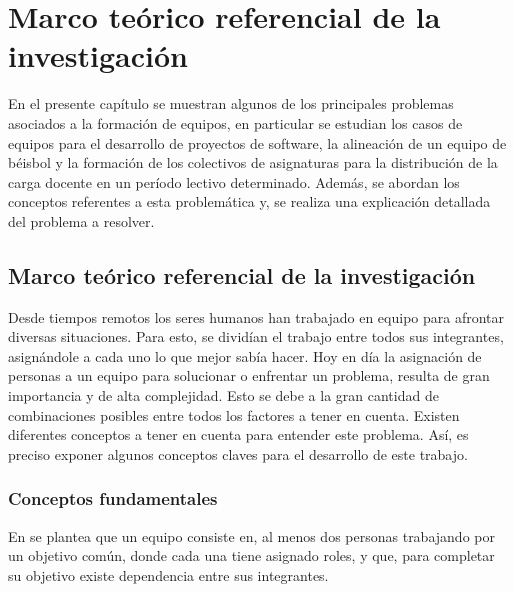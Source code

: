 \chapter{Marco teórico referencial de la investigación}\label{chap:1}

En el presente capítulo se muestran algunos de los principales problemas asociados a la formación de equipos, en particular se estudian los casos de equipos para el desarrollo de proyectos de software, la alineación de un equipo de béisbol y la formación de los colectivos de asignaturas para la distribución de la carga docente en un período lectivo determinado. Además, se abordan los conceptos referentes a esta problemática y, se realiza una explicación detallada del problema a resolver.

\section{Marco teórico referencial de la investigación}

Desde tiempos remotos los seres humanos han trabajado en equipo para afrontar diversas situaciones. Para esto, se dividían el trabajo entre todos sus integrantes, asignándole a cada uno lo que mejor sabía hacer. Hoy en día la asignación de personas a un equipo para solucionar o enfrentar un problema, resulta de gran importancia y de alta complejidad. Esto se debe a la gran cantidad de combinaciones posibles entre todos los factores a tener en cuenta. Existen diferentes conceptos a tener en cuenta para entender este problema. Así, es preciso exponer algunos conceptos claves para el desarrollo de este trabajo.

\subsection{Conceptos fundamentales}


En \cite{63} se plantea que un equipo consiste en, al menos dos personas trabajando por un objetivo común, donde cada una tiene asignado roles, y que, para completar su objetivo existe dependencia entre sus integrantes.\\

